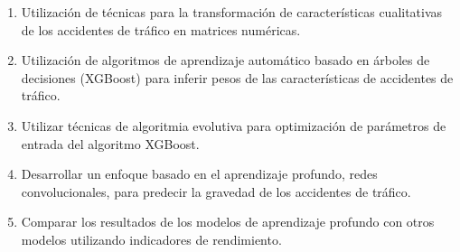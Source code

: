 		\begin{enumerate}
		    \item Utilización de técnicas para la transformación de características cualitativas de los accidentes de tráfico en matrices numéricas.
		    \item Utilización de algoritmos de aprendizaje automático basado en árboles de decisiones (XGBoost) para inferir pesos de las características de accidentes de tráfico.
		    \item Utilizar técnicas de algoritmia evolutiva para optimización de parámetros de entrada del algoritmo XGBoost.
		    \item Desarrollar un enfoque basado en el aprendizaje profundo, redes convolucionales, para predecir la gravedad de los accidentes de tráfico.
		    \item Comparar los resultados de los modelos de aprendizaje profundo con otros modelos utilizando indicadores de rendimiento.
		\end{enumerate}

